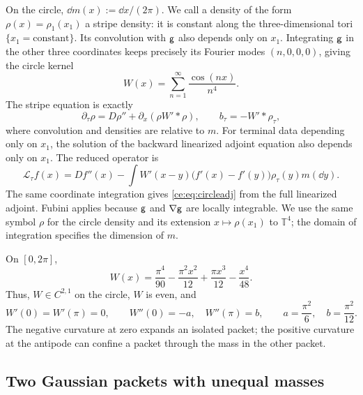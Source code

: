 \documentclass[11pt,reqno]{amsart}
\numberwithin{equation}{section}
\theoremstyle{plain}
\theoremstyle{remark}
\newcommand{\T}{\mathbb T}\newcommand{\R}{\mathbb R}\newcommand{\Z}{\mathbb Z}
\begin{document}
On the circle, $\dd m(x):=\dd x/(2\pi)$. We call a density of the form $\rho(x)=\rho_1(x_1)$ a stripe density: it is constant along the three-dimensional tori $\{x_1=\text{constant}\}$. Its convolution with $\mathsf g$ also depends only on $x_1$. Integrating $\mathsf g$ in the other three coordinates keeps precisely its Fourier modes $(n,0,0,0)$, giving the circle kernel
\begin{equation}\label{ce:eq:W}
 W(x)=\sum_{n=1}^\infty\frac{\cos(nx)}{n^4}.
\end{equation}
The stripe equation is exactly
\begin{equation}\label{ce:eq:circleMF}
 \partial_\tau\rho=D\rho''+\partial_x(\rho W'*\rho),\qquad
 b_\tau=-W'*\rho_\tau,
\end{equation}
where convolution and densities are relative to $m$. For terminal data depending only on $x_1$, the solution of the backward linearized adjoint equation also depends only on $x_1$. The reduced operator is
\begin{equation}\label{ce:eq:circleadj}
 \mathcal L_\tau f(x)
 =Df''(x)-\int W'(x-y)\bigl(f'(x)-f'(y)\bigr)\rho_\tau(y)m(\dd y).
\end{equation}
The same coordinate integration gives \eqref{ce:eq:circleadj} from the full linearized adjoint. Fubini applies because $\mathsf g$ and $\nabla\mathsf g$ are locally integrable. We use the same symbol $\rho$ for the circle density and its extension $x\mapsto\rho(x_1)$ to $\T^4$; the domain of integration specifies the dimension of $m$.

On $[0,2\pi]$,
\begin{equation}\label{ce:eq:Wpoly}
 W(x)=\frac{\pi^4}{90}-\frac{\pi^2x^2}{12}
 +\frac{\pi x^3}{12}-\frac{x^4}{48}.
\end{equation}
Thus, $W\in C^{2,1}$ on the circle, $W$ is even, and
\begin{equation}\label{ce:eq:curvatures}
 W'(0)=W'(\pi)=0,\qquad
 W''(0)=-a,\quad W''(\pi)=b,
 \qquad a=\frac{\pi^2}{6},\quad b=\frac{\pi^2}{12}.
\end{equation}
The negative curvature at zero expands an isolated packet; the positive curvature at the antipode can confine a packet through the mass in the other packet.

\subsection{Two Gaussian packets with unequal masses}\label{ce:sec:packet}
\end{document}
